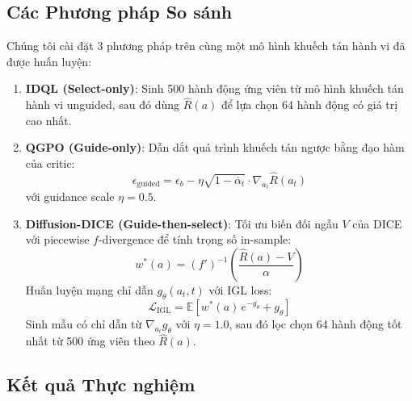 \subsection{Các Phương pháp So sánh}

Chúng tôi cài đặt 3 phương pháp trên cùng một mô hình khuếch tán hành vi đã
được huấn luyện:

\begin{enumerate}
    \item \textbf{IDQL (Select-only)}: Sinh 500 hành động ứng viên từ mô hình
    khuếch tán hành vi unguided, sau đó dùng $\hat{R}(a)$ để lựa chọn 64 hành
    động có giá trị cao nhất.

    \item \textbf{QGPO (Guide-only)}: Dẫn dắt quá trình khuếch tán ngược bằng
    đạo hàm của critic:
    \[
        \epsilon_{\text{guided}}
        = \epsilon_b
          - \eta \sqrt{1 - \bar{\alpha}_t} \cdot \nabla_{a_t} \hat{R}(a_t)
    \]
    với guidance scale $\eta = 0.5$.

    \item \textbf{Diffusion-DICE (Guide-then-select)}: Tối ưu biến đối ngẫu $V$
    của DICE với piecewise $f$-divergence để tính trọng số in-sample:
    \[
        w^*(a) = (f')^{-1}\!\left(\frac{\hat{R}(a) - V}{\alpha}\right)
    \]
    Huấn luyện mạng chỉ dẫn $g_\theta(a_t, t)$ với IGL loss:
    \[
        \mathcal{L}_{\text{IGL}} = \mathbb{E}\!\left[w^*(a)\,e^{-g_\theta} + g_\theta\right]
    \]
    Sinh mẫu có chỉ dẫn từ $\nabla_{a_t} g_\theta$ với $\eta = 1.0$, sau đó lọc
    chọn 64 hành động tốt nhất từ 500 ứng viên theo $\hat{R}(a)$.
\end{enumerate}

\subsection{Kết quả Thực nghiệm}

